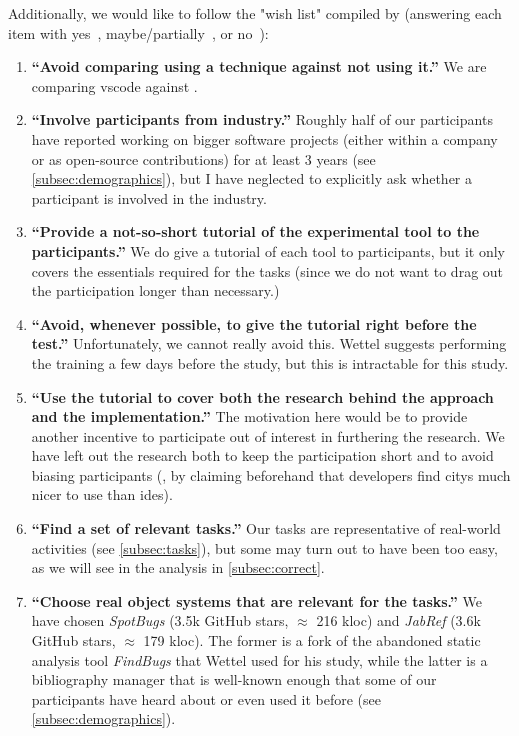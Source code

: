 \documentclass[../thesis]{subfiles}
\begin{document}
Additionally, we would like to follow the "wish list" compiled by \textcite[122--124]{wettel2011} (answering each item with yes~\cyes, maybe/partially~\chmm, or no~\cno):
\begin{enumerate}
	\item \textbf{\enquote{Avoid comparing using a technique against not using it.}}
	      We are comparing \gls{vscode} against \SEE{}. \cyes
	\item \textbf{\enquote{Involve participants from industry.}}
	      Roughly half of our participants have reported working on bigger software projects (either within a company or as open-source contributions) for at least 3 years (see \cref{subsec:demographics}), but I have neglected to explicitly ask whether a participant is involved in the industry. \chmm
	\item \textbf{\enquote{Provide a not-so-short tutorial of the experimental tool to the participants.}}
	      We do give a tutorial of each tool to participants, but it only covers the essentials required for the tasks (since we do not want to drag out the participation longer than necessary.) \chmm
	\item \textbf{\enquote{Avoid, whenever possible, to give the tutorial right before the test.}}
	      Unfortunately, we cannot really avoid this.
	      Wettel suggests performing the training a few days before the study, but this is intractable for this study. \cno
	\item \textbf{\enquote{Use the tutorial to cover both the research behind the approach and the implementation.}}
	      The motivation here would be to provide another incentive to participate out of interest in furthering the research.
	      We have left out the research both to keep the participation short and to avoid biasing participants (\eg, by claiming beforehand that developers find \glspl{city} much nicer to use than \glspl{ide}). \cno
	\item \textbf{\enquote{Find a set of relevant tasks.}}
	      Our tasks are representative of real-world activities (see \cref{subsec:tasks}), but some may turn out to have been too easy, as we will see in the analysis in \cref{subsec:correct}. \chmm
	\item \textbf{\enquote{Choose real object systems that are relevant for the tasks.}}
	      We have chosen \emph{SpotBugs} (3.5k GitHub stars, $\approx$ 216 k\gls{loc}) and \emph{JabRef} (3.6k GitHub stars, $\approx$ 179 k\gls{loc}).
	      The former is a fork of the abandoned static analysis tool \emph{FindBugs} that Wettel used for his study, while the latter is a bibliography manager that is well-known enough that some of our participants have heard about or even used it before (see \cref{subsec:demographics}).~\cyes

\end{enumerate}
\end{document}
